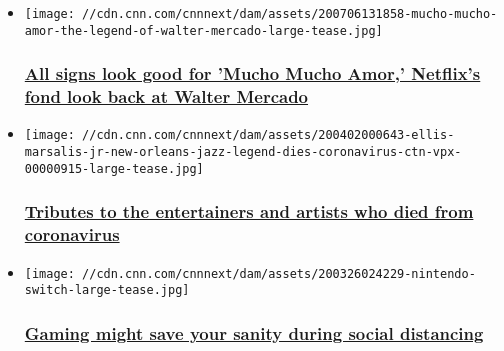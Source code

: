 \begin{itemize}
\item
  \href{/2020/07/07/entertainment/mucho-mucho-amor-review/index.html}{}

  \texttt{[image: //cdn.cnn.com/cnnnext/dam/assets/200706131858-mucho-mucho-amor-the-legend-of-walter-mercado-large-tease.jpg]}

  \hypertarget{all-signs-look-good-for-mucho-mucho-amor-netflixs-fond-look-back-at-walter-mercado}{%
  \subsubsection{\texorpdfstring{\href{/2020/07/07/entertainment/mucho-mucho-amor-review/index.html}{All
  signs look good for 'Mucho Mucho Amor,' Netflix's fond look back at
  Walter
  Mercado}}{All signs look good for 'Mucho Mucho Amor,' Netflix's fond look back at Walter Mercado}}\label{all-signs-look-good-for-mucho-mucho-amor-netflixs-fond-look-back-at-walter-mercado}}
\item
  \href{/2020/04/24/entertainment/entertainers-weve-lost-to-coronavirus/index.html}{}

  \texttt{[image: //cdn.cnn.com/cnnnext/dam/assets/200402000643-ellis-marsalis-jr-new-orleans-jazz-legend-dies-coronavirus-ctn-vpx-00000915-large-tease.jpg]}

  \hypertarget{tributes-to-the-entertainers-and-artists-who-died-from-coronavirus}{%
  \subsubsection{\texorpdfstring{\href{/2020/04/24/entertainment/entertainers-weve-lost-to-coronavirus/index.html}{Tributes
  to the entertainers and artists who died from
  coronavirus}}{Tributes to the entertainers and artists who died from coronavirus}}\label{tributes-to-the-entertainers-and-artists-who-died-from-coronavirus}}
\item
  \href{/2020/03/26/entertainment/gaming-social-distancing/index.html}{}

  \texttt{[image: //cdn.cnn.com/cnnnext/dam/assets/200326024229-nintendo-switch-large-tease.jpg]}

  \hypertarget{gaming-might-save-your-sanity-during-social-distancing}{%
  \subsubsection{\texorpdfstring{\href{/2020/03/26/entertainment/gaming-social-distancing/index.html}{Gaming
  might save your sanity during social
  distancing}}{Gaming might save your sanity during social distancing}}\label{gaming-might-save-your-sanity-during-social-distancing}}
\end{itemize}


